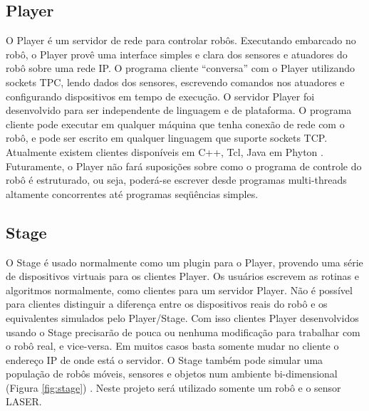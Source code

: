 \subsection{Player}
\label{player}
O Player é um servidor de rede para controlar robôs. Executando embarcado no robô, o Player provê uma interface simples e clara dos sensores e atuadores do robô sobre uma rede IP. O programa cliente ``conversa'' com o Player utilizando sockets TPC, lendo dados dos sensores, escrevendo comandos nos atuadores e configurando dispositivos em tempo de execução.
O servidor Player foi desenvolvido para ser independente de linguagem e de plataforma. O programa cliente pode executar em qualquer máquina que tenha conexão de rede com o robô, e pode ser escrito em qualquer linguagem que suporte sockets TCP. Atualmente existem clientes disponíveis em C++, Tcl, Java em Phyton \cite{Player}. Futuramente, o Player não fará suposições sobre como o programa de controle do robô é estruturado, ou seja, poderá-se escrever desde programas multi-threads altamente concorrentes até programas seqüências simples.

\subsection{Stage}
\label{stage}
O Stage é usado normalmente como um plugin para o Player, provendo uma série de dispositivos virtuais para os clientes Player. Os usuários escrevem as rotinas e algoritmos normalmente, como clientes para um servidor Player. Não é possível para clientes distinguir a diferença entre os dispositivos reais do robô e os equivalentes simulados pelo Player/Stage. Com isso clientes Player desenvolvidos usando o Stage precisarão de pouca ou nenhuma modificação para trabalhar com o robô real, e vice-versa. Em muitos casos basta somente mudar no cliente o endereço IP de onde está o servidor. O Stage também pode simular uma população de robôs móveis, sensores e objetos num ambiente bi-dimensional (Figura \ref{fig:stage}) \cite{Player}. Neste projeto será utilizado somente um robô e o sensor LASER.





